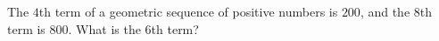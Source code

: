 The $4$th term of a geometric sequence of positive numbers is $200$, and the $8$th term is $800$. What is the $6$th term?
